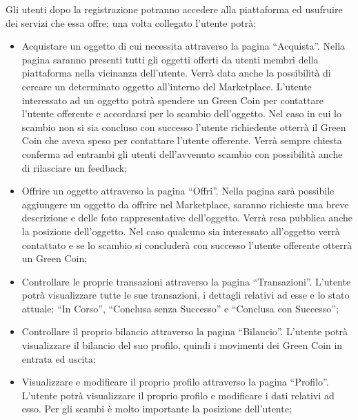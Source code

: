 Gli utenti dopo la registrazione potranno accedere alla piattaforma ed usufruire dei servizi che essa offre; una volta collegato l’utente potrà:  
\begin{itemize}
    \item Acquistare un oggetto di cui necessita attraverso la pagina “Acquista”. Nella pagina saranno presenti tutti gli oggetti offerti da utenti membri della piattaforma nella vicinanza dell’utente. Verrà data anche la possibilità di cercare un determinato oggetto all’interno del Marketplace. L’utente interessato ad un oggetto potrà spendere un Green Coin per contattare l’utente offerente e accordarsi per lo scambio dell’oggetto. Nel caso in cui lo scambio non si sia concluso con successo l’utente richiedente otterrà il Green Coin che aveva speso per contattare l’utente offerente. Verrà sempre chiesta conferma ad entrambi gli utenti dell’avvenuto scambio con possibilità anche di rilasciare un feedback;
    \item Offrire un oggetto attraverso la pagina “Offri”. Nella pagina sarà possibile aggiungere un oggetto da offrire nel Marketplace, saranno richieste una breve descrizione e delle foto rappresentative dell’oggetto. Verrà resa pubblica anche la posizione dell’oggetto. Nel caso qualcuno sia interessato all’oggetto verrà contattato e se lo scambio si concluderà con successo l’utente offerente otterrà un Green Coin;
    \item Controllare le proprie transazioni attraverso la pagina “Transazioni”. L’utente potrà visualizzare tutte le sue transazioni, i dettagli relativi ad esse e lo stato attuale: “In Corso”, “Conclusa senza Successo” e “Conclusa con Successo”;
    \item Controllare il proprio bilancio attraverso la pagina “Bilancio”. L’utente potrà visualizzare il bilancio del suo profilo, quindi i movimenti dei Green Coin in entrata ed uscita;
    \item Visualizzare e modificare il proprio profilo attraverso la pagina “Profilo”. L’utente potrà visualizzare il proprio profilo e modificare i dati relativi ad esso. Per gli scambi è molto importante la posizione dell’utente;
\end{itemize}
